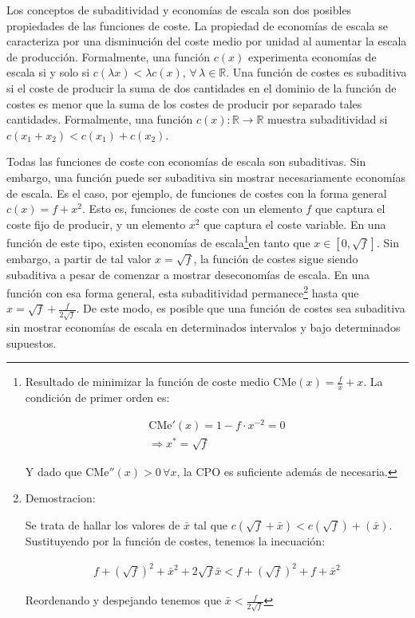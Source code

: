 \documentclass{nuevotema}
\begin{document}
Los conceptos de subaditividad y economías de escala son dos posibles propiedades de las funciones de coste. La propiedad de economías de escala se caracteriza por una disminución del coste medio por unidad al aumentar la escala de producción. Formalmente, una función $c(x)$ experimenta economías de escala si y solo si $c(\lambda x) < \lambda c(x)$, $\forall \, \lambda \in \mathbb{R}$. Una función de costes es subaditiva si el coste de producir la suma de dos cantidades en el dominio de la función de costes es menor que la suma de los costes de producir por separado tales cantidades. Formalmente, una función $c(x): \mathbb{R} \to \mathbb{R}$ muestra subaditividad si $c(x_1 + x_2) < c(x_1) + c(x_2)$.

Todas las funciones de coste con economías de escala son subaditivas. Sin embargo, una función puede ser subaditiva sin mostrar necesariamente economías de escala. Es el caso, por ejemplo, de funciones de costes con la forma general $c(x) = f + x^2$. Esto es, funciones de coste con un elemento $f$ que captura el coste fijo de producir, y un elemento $x^2$ que captura el coste variable. En una función de este tipo, existen economías de escala\footnote{Resultado de minimizar la función de coste medio $\text{CMe}(x) = \frac{f}{x} + x$. La condición de primer orden es:
	
	\begin{align*}
		\text{CMe}'(x) = 1 - f \cdot x^{-2} = 0 \\
		\Rightarrow x^* = \sqrt{f}
	\end{align*}
	
Y dado que $\text{CMe}''(x) > 0 \, \forall x$, la CPO es suficiente además de necesaria. }en tanto que $x \in [0, \sqrt{f}]$. Sin embargo, a partir de tal valor $x=\sqrt{f}$, la función de costes sigue siendo subaditiva a pesar de comenzar a mostrar deseconomías de escala. En una función con esa forma general, esta subaditividad permanece\footnote{Demostracion:

Se trata de hallar los valores de $\bar{x}$ tal que $c(\sqrt{f} + \bar{x}) < c(\sqrt{f}) + (\bar{x})$. Sustituyendo por la función de costes, tenemos la inecuación:

\begin{align*}
	f + \left( \sqrt{f} \right)^2 + \bar{x}^2 + 2 \sqrt{f} \bar{x} < f + \left( \sqrt{f} \right)^2 + f + \bar{x}^2
\end{align*}

Reordenando y despejando tenemos que $\bar{x} < \frac{f}{2 \sqrt{f}}$

} hasta que $x=\sqrt{f} + \frac{f}{2 \sqrt{f}}$. De este modo, es posible que una función de costes sea subaditiva sin mostrar economías de escala en determinados intervalos y bajo determinados supuestos.
\end{document}
